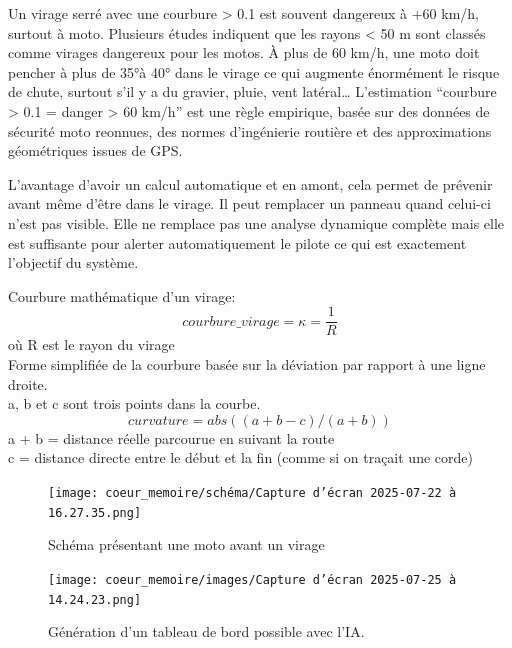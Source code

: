 Un virage serré avec une courbure > 0.1 est souvent dangereux à +60 km/h, surtout à moto.
Plusieurs études indiquent que les rayons < 50 m sont classés comme virages dangereux pour les motos. À plus de 60 km/h, une moto doit pencher à plus de 35°à 40° dans le virage ce qui augmente énormément le risque de chute, surtout s’il y a du gravier, pluie, vent latéral…
L’estimation “courbure > 0.1 = danger > 60 km/h” est une règle empirique, basée sur des données de sécurité moto reonnues, des normes d'ingénierie routière et des approximations géométriques issues de GPS.


L'avantage d'avoir un calcul automatique et en amont, cela permet de prévenir avant même d'être dans le virage. Il peut remplacer un panneau quand celui-ci n'est pas visible. Elle ne remplace pas une analyse dynamique complète mais elle est suffisante pour alerter automatiquement le pilote ce qui est exactement l’objectif du système.



\begin{tcolorbox}[title=Calcul de la courbure]
Courbure mathématique\cite{formule_curvature} d’un virage:
\[
courbure\_virage = \kappa = \frac{1}{R}
\]
où R est le rayon du virage\\
Forme simplifiée de la courbure basée sur la déviation par rapport à une ligne droite.\\
a, b et c sont trois points dans la courbe.\\
\[
curvature = abs((a + b - c) / (a + b))
\]
a + b = distance réelle parcourue en suivant la route \\
c = distance directe entre le début et la fin (comme si on traçait une corde)
\end{tcolorbox}

\begin{figure}[H]
    \centering
    \texttt{[image: coeur\_memoire/schéma/Capture d’écran 2025-07-22 à 16.27.35.png]} 
    \caption{Schéma présentant une moto avant un virage}
\end{figure}







\begin{figure}[H]
    \centering
    \texttt{[image: coeur\_memoire/images/Capture d’écran 2025-07-25 à 14.24.23.png]} 
    \caption{Génération d'un tableau de bord possible avec l'IA.}
\end{figure}